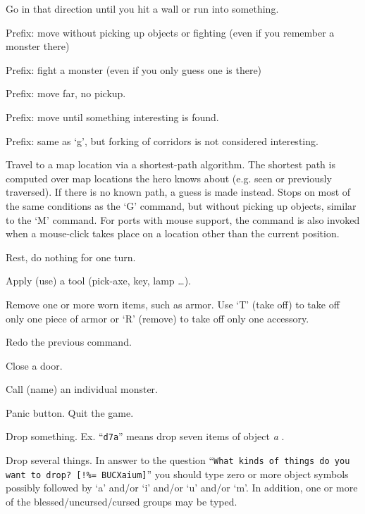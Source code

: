 \item[\tb{[YUHJKLBN]}]
Go in that direction until you hit a wall or run into something.
\item[\tb{m[yuhjklbn]}]
Prefix:  move without picking up objects or fighting (even if you remember
a monster there)
\item[\tb{F[yuhjklbn]}]
Prefix:  fight a monster (even if you only guess one is there)
\item[\tb{M[yuhjklbn]}]
Prefix:  move far, no pickup.
\item[\tb{"g[yuhjklbn]}]
Prefix:  move until something interesting is found.
\item[\tb{"G[yuhjklbn] or <CONTROL->[yuhjklbn]}]
Prefix:  same as `g', but forking of corridors is not considered interesting.
\item[\tb{\_}]
Travel to a map location via a shortest-path algorithm.  The shortest path
is computed over map locations the hero knows about (e.g. seen or
previously traversed).  If there is no known path, a guess is made instead.
Stops on most of
the same conditions as the `G' command, but without picking up
objects, similar to the `M' command.  For ports with mouse 
support, the command is also invoked when a mouse-click takes place on a 
location other than the current position.
\item[\tb{.}]
Rest, do nothing for one turn.
\item[\tb{a}]
Apply (use) a tool (pick-axe, key, lamp \ldots).
\item[\tb{A}]
Remove one or more worn items, such as armor.
Use `T' (take off) to take off only one piece of armor 
or `R' (remove) to take off only one accessory.
\item[\tb{\^A}]
Redo the previous command.
\item[\tb{c}]
Close a door.
\item[\tb{C}]
Call (name) an individual monster.
\item[\tb{\^C}]
Panic button.  Quit the game.
\item[\tb{d}]
Drop something.  Ex. ``{\tt d7a}'' means drop seven items of object %
{\it  a}%
.
\item[\tb{D}]
Drop several things.  In answer to the question
``{\tt What kinds of things do you want to drop? [!\%= BUCXaium]}''
you should type zero or more object symbols possibly followed by 
`a' and/or `i' and/or `u' and/or `m'.  In addition, one or more of
the blessed/uncursed/cursed groups may be typed.
